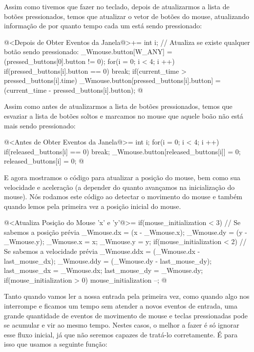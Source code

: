 Assim como tivemos que fazer no teclado, depois de atualizarmos a
lista de botões pressionados, temos que atualizar o vetor de botões do
mouse, atualizando informação de por quanto tempo cada um está sendo
pressionado:

\iniciocodigo
@<Depois de Obter Eventos da Janela@>+=
{
  int i;
  // Atualiza se existe qualquer botão sendo pressionado:
  _Wmouse.button[W_ANY] = (pressed_buttons[0].button != 0);
  for(i = 0; i < 4; i ++){
    if(pressed_buttons[i].button == 0)
      break;
    if(current_time > pressed_buttons[i].time)
      _Wmouse.button[pressed_buttons[i].button] =
        (current_time - pressed_buttons[i].button);
  }
}
@
\fimcodigo

Assim como antes de atualizarmos a lista de botões pressionados, temos
que esvaziar a lista de botões soltos e marcamos no mouse que aquele
boão não está mais sendo pressionado:

\iniciocodigo
@<Antes de Obter Eventos da Janela@>=
{
  int i;
  for(i = 0; i < 4; i ++){
    if(released_buttons[i] == 0)
      break;
    _Wmouse.button[released_buttons[i]] = 0;
    released_buttons[i] = 0;
  }
}
@
\fimcodigo

E agora mostramos o código para atualizar a posição do mouse, bem como
sua velocidade e aceleração (a depender do quanto avançamos na
inicialização do mouse). Nós rodamos este código ao detectar o
movimento do mouse e também quando lemos pela primeira vez a posição
inicial do mouse.

\iniciocodigo
@<Atualiza Posição do Mouse 'x' e 'y'@>=
{
  if(mouse_initialization < 3){ // Se sabemos a posição prévia
    _Wmouse.dx = (x - _Wmouse.x);
    _Wmouse.dy = (y - _Wmouse.y);
  }
  _Wmouse.x = x;
  _Wmouse.y = y;
  if(mouse_initialization < 2){ // Se sabemos a velocidade prévia
    _Wmouse.ddx = (_Wmouse.dx - last_mouse_dx);
    _Wmouse.ddy = (_Wmouse.dy - last_mouse_dy);
  }
  last_mouse_dx = _Wmouse.dx;
  last_mouse_dy = _Wmouse.dy;
  if(mouse_initialization > 0)
    mouse_initialization --;
}
@
\fimcodigo


Tanto quando vamos ler a nossa entrada pela primeira vez, como quando
algo nos interrompe e ficamos um tempo sem atender a novos eventos de
entrada, uma grande quantidade de eventos de movimento de mouse e
teclas pressionadas pode se acumular e vir ao mesmo tempo. Nestes
casos, o melhor a fazer é só ignorar esse fluxo inicial, já que não
seremos capazes de tratá-lo corretamente. É para isso que usamos a
seguinte função:

